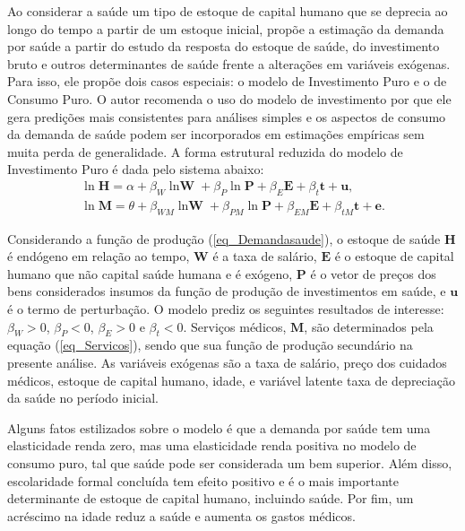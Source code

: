 \documentclass[twoside,onecolumn,12pt]{article}
\numberwithin{outputctr}{section}
\begin{document}
Ao considerar a sa\'{u}de um tipo de estoque de capital humano que se deprecia ao longo do tempo a partir de um estoque inicial,  prop\~{o}e a estima\c{c}\~{a}o da demanda por saúde a partir do estudo da resposta do estoque de sa\'{u}de, do investimento bruto e outros determinantes de sa\'{u}de frente a altera\c{c}\~{o}es em vari\'{a}veis ex\'{o}genas. Para isso, ele prop\~{o}e dois casos especiais: o modelo de Investimento Puro e o de Consumo Puro. O autor recomenda o uso do modelo de investimento por que ele gera predi\c{c}\~{o}es mais consistentes para an\'{a}lises simples e os aspectos de consumo da demanda de sa\'{u}de podem ser incorporados em estima\c{c}\~{o}es emp\'{i}ricas sem muita perda de generalidade. A forma estrutural reduzida do modelo de Investimento Puro \'{e} dada pelo sistema abaixo:
\begin{subequations}
\begin{align}\label{eq_Demandasaude}
        \ln{\textbf{H}} = \alpha + \beta_W{\ln{\textbf{W}}} + \beta_P \ln{\textbf{P}} + \beta_E{\textbf{E}} + \beta_t{\textbf{t}} + \textbf{u},\\
        \ln{\textbf{M}} = \theta + \beta_{WM}{\ln{\textbf{W}}} +\beta_{PM}\ln{\textbf{P}} + \beta_{EM}{\textbf{E}} + \beta_{tM}{\textbf{t}} + \textbf{e}.\label{eq_Servicos}
\end{align}
\end{subequations}

Considerando a fun\c{c}\~{a}o de produ\c{c}\~{a}o (\ref{eq_Demandasaude}), o estoque de sa\'{u}de $\textbf{H}$ \'{e} end\'{o}geno em rela\c{c}\~{a}o ao tempo, $\textbf{W}$ \'{e} a taxa de sal\'{a}rio, $\textbf{E}$ \'{e} o estoque de capital humano que n\~{a}o capital sa\'{u}de humana e \'{e} ex\'{o}geno, $\textbf{P}$ \'{e} o vetor de pre\c{c}os dos bens considerados insumos da fun\c{c}\~{a}o de produ\c{c}\~{a}o de investimentos em sa\'{u}de, e $\textbf{u}$ é o termo de perturba\c{c}\~{a}o. O modelo prediz os seguintes resultados de interesse: $\beta_W>0$, $\beta_P<0$, $\beta_E>0$ e $\beta_t<0$. Servi\c{c}os m\'{e}dicos, $\textbf{M}$, s\~{a}o determinados pela equa\c{c}\~{a}o (\ref{eq_Servicos}), sendo que sua fun\c{c}\~{a}o de produ\c{c}\~{a}o secund\'{a}rio na presente an\'{a}lise. As vari\'{a}veis ex\'{o}genas s\~{a}o a taxa de sal\'{a}rio, pre\c{c}o dos cuidados m\'{e}dicos, estoque de capital humano, idade, e vari\'{a}vel latente taxa de deprecia\c{c}\~{a}o da sa\'{u}de no per\'{i}odo inicial.

Alguns fatos estilizados sobre o modelo \'{e} que a demanda por sa\'{u}de tem uma elasticidade renda zero, mas uma elasticidade renda positiva no modelo de consumo puro, tal que sa\'{u}de pode ser considerada um bem superior. Al\'{e}m disso, escolaridade formal conclu\'{i}da tem efeito positivo e \'{e} o mais importante determinante de estoque de capital humano, incluindo sa\'{u}de. Por fim, um acr\'{e}scimo na idade reduz a sa\'{u}de e aumenta os gastos m\'{e}dicos.
\end{document}
